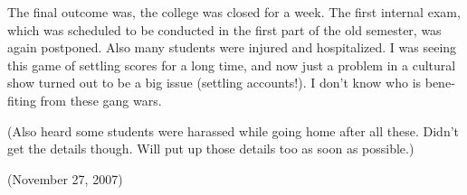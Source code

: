 \begin{english}
The final outcome was, the college was closed for a week. The first internal exam, which was scheduled to be conducted in the first part of the old semester, was again postponed. Also many students were injured and hospitalized. I was seeing this game of settling scores for a long time, and now just a problem in a cultural show turned out to be a big issue (settling accounts!). I don’t know who is benefiting from these gang wars.

(Also heard some students were harassed while going home after all these. Didn't get the details though. Will put up those details too as soon as possible.)

\begin{flushright}(November 27, 2007)\end{flushright}
\end{english}
\newpage
